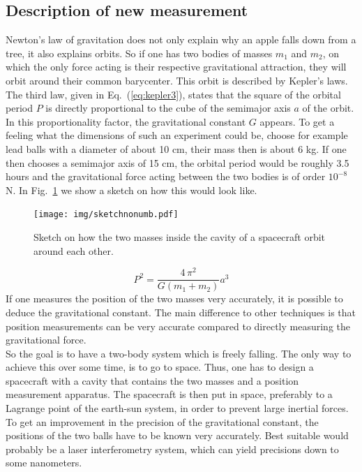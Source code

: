 \documentclass[prb,preprint]{revtex4-1}
\begin{document}
\subsection{Description of new measurement}
Newton's law of gravitation does not only explain why an apple falls down from a tree, it also explains orbits. So if one has two bodies of masses $m_1$ and $m_2$, on which the only force acting is their respective gravitational attraction, they will orbit around their common barycenter. This orbit is described by Kepler's laws. The third law, given in Eq.~(\ref{eq:kepler3}), states that the square of the orbital period $P$ is directly proportional to the cube of the semimajor axis $a$ of the orbit. In this proportionality factor, the gravitational constant $G$ appears. To get a feeling what the dimensions of such an experiment could be, choose for example lead balls with a diameter of about 10 cm, their mass then is about 6 kg. If one then chooses a semimajor axis of 15 cm, the orbital period would be roughly 3.5 hours and the gravitational force acting between the two bodies is of order $10^{-8}$ N. In Fig.~\ref{fig:sketch} we show a sketch on how this would look like.
\begin{figure}
	\centering
	\texttt{[image: img/sketchnonumb.pdf]}
	\caption{Sketch on how the two masses inside the cavity of a spacecraft orbit around each other.}
	\label{fig:sketch}
\end{figure}
\begin{equation}\label{eq:kepler3}
P^2 = \frac{4 \, \pi^2}{G(m_1+m_2)}a^3
\end{equation}
If one measures the position of the two masses very accurately, it is possible to deduce the gravitational constant. The main difference to other techniques is that position measurements can be very accurate compared to directly measuring the gravitational force.\\

So the goal is to have a two-body system which is freely falling. The only way to achieve this over some time, is to go to space. Thus, one has to design a spacecraft with a cavity that contains the two masses and a position measurement apparatus. The spacecraft is then put in space, preferably to a Lagrange point of the earth-sun system, in order to prevent large inertial forces. To get an improvement in the precision of the gravitational constant, the positions of the two balls have to be known very accurately. Best suitable would probably be a laser interferometry system, which can yield precisions down to some nanometers.\cite{Loughridge13} \\
\end{document}
